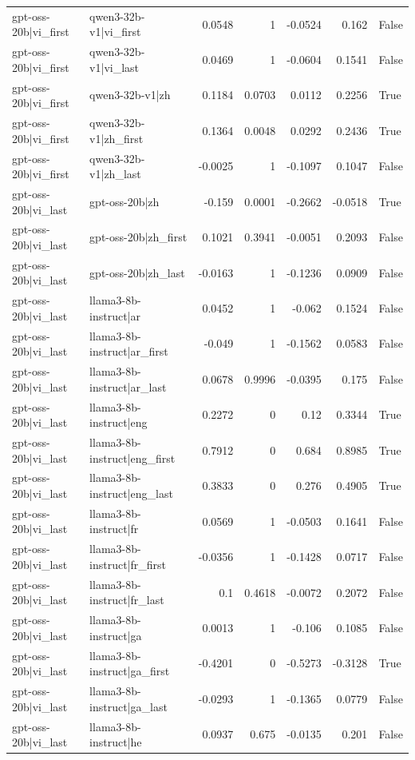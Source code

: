 \begin{table}
\begin{tabular}{l l r r r r l}
gpt-oss-20b|vi_first & qwen3-32b-v1|vi_first & 0.0548 & 1 & -0.0524 & 0.162 & False \\
gpt-oss-20b|vi_first & qwen3-32b-v1|vi_last & 0.0469 & 1 & -0.0604 & 0.1541 & False \\
gpt-oss-20b|vi_first & qwen3-32b-v1|zh & 0.1184 & 0.0703 & 0.0112 & 0.2256 & True \\
gpt-oss-20b|vi_first & qwen3-32b-v1|zh_first & 0.1364 & 0.0048 & 0.0292 & 0.2436 & True \\
gpt-oss-20b|vi_first & qwen3-32b-v1|zh_last & -0.0025 & 1 & -0.1097 & 0.1047 & False \\
gpt-oss-20b|vi_last & gpt-oss-20b|zh & -0.159 & 0.0001 & -0.2662 & -0.0518 & True \\
gpt-oss-20b|vi_last & gpt-oss-20b|zh_first & 0.1021 & 0.3941 & -0.0051 & 0.2093 & False \\
gpt-oss-20b|vi_last & gpt-oss-20b|zh_last & -0.0163 & 1 & -0.1236 & 0.0909 & False \\
gpt-oss-20b|vi_last & llama3-8b-instruct|ar & 0.0452 & 1 & -0.062 & 0.1524 & False \\
gpt-oss-20b|vi_last & llama3-8b-instruct|ar_first & -0.049 & 1 & -0.1562 & 0.0583 & False \\
gpt-oss-20b|vi_last & llama3-8b-instruct|ar_last & 0.0678 & 0.9996 & -0.0395 & 0.175 & False \\
gpt-oss-20b|vi_last & llama3-8b-instruct|eng & 0.2272 & 0 & 0.12 & 0.3344 & True \\
gpt-oss-20b|vi_last & llama3-8b-instruct|eng_first & 0.7912 & 0 & 0.684 & 0.8985 & True \\
gpt-oss-20b|vi_last & llama3-8b-instruct|eng_last & 0.3833 & 0 & 0.276 & 0.4905 & True \\
gpt-oss-20b|vi_last & llama3-8b-instruct|fr & 0.0569 & 1 & -0.0503 & 0.1641 & False \\
gpt-oss-20b|vi_last & llama3-8b-instruct|fr_first & -0.0356 & 1 & -0.1428 & 0.0717 & False \\
gpt-oss-20b|vi_last & llama3-8b-instruct|fr_last & 0.1 & 0.4618 & -0.0072 & 0.2072 & False \\
gpt-oss-20b|vi_last & llama3-8b-instruct|ga & 0.0013 & 1 & -0.106 & 0.1085 & False \\
gpt-oss-20b|vi_last & llama3-8b-instruct|ga_first & -0.4201 & 0 & -0.5273 & -0.3128 & True \\
gpt-oss-20b|vi_last & llama3-8b-instruct|ga_last & -0.0293 & 1 & -0.1365 & 0.0779 & False \\
gpt-oss-20b|vi_last & llama3-8b-instruct|he & 0.0937 & 0.675 & -0.0135 & 0.201 & False \\

\end{tabular}
\end{table}
